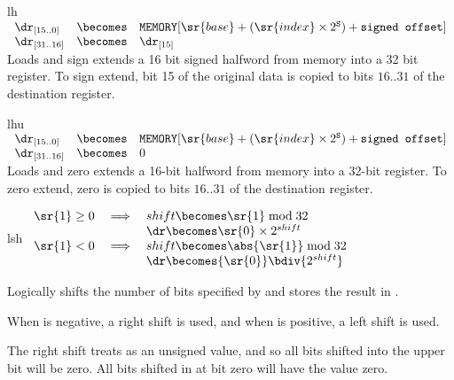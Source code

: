 \begin{instruction}{lh}
     {\lhopc}
     {
       \begin{math}
         \begin{array}{lcl}
           {\dr}_{[15..0]} & \becomes & \texttt{MEMORY}[\sr{base} +
            (\sr{index} \times 2^{\texttt{S}}) + \texttt{signed offset}] \\
           {\dr}_{[31..16]} & \becomes & {\dr}_{[15]} \\
         \end{array}
       \end{math}
     }
     {
       Loads and sign extends a 16 bit signed halfword from memory
       into a 32 bit register.  To sign extend, bit 15 of
       the original data is copied to bits ${16..31}$ of the
       destination register.
     }
\end{instruction}

\begin{instruction}{lhu}
     {\lhuopc}
     {
       \begin{math}
         \begin{array}{lcl}
           {\dr}_{[15..0]} & \becomes & \texttt{MEMORY}[\sr{base} +
            (\sr{index} \times 2^{\texttt{S}}) + \texttt{signed offset}] \\
           {\dr}_{[31..16]} & \becomes & 0 \\
         \end{array}
       \end{math}
     }
     {
       Loads and zero extends a 16-bit halfword from memory into a
       32-bit register.  To zero extend, zero is copied to bits
       ${16..31}$ of the destination register.
     }
\end{instruction}


\begin{instruction}{lsh}
   {\rlshopc}
   {
     \begin{math}
       \begin{array}{rcl}
         \sr{1} \geq 0 & \implies & shift \becomes \sr{1} \bmod 32  \\
                       &          & \dr \becomes \sr{0} \times 2^{shift}  \\
         \sr{1} <    0 & \implies & shift \becomes \abs{\sr{1}} \bmod 32        \\
                       &          & \dr \becomes {\sr{0}} \bdiv {2^{shift} }\\
       \end{array}
     \end{math}
   }
   {
     Logically shifts  the number of bits specified by 
     and stores the result in \dr.

     When  is negative, a right shift is used, and when 
     is positive, a left shift is used.

     The right shift treats  as an unsigned value, and so all
     bits shifted into the upper bit will be zero.  All bits shifted
     in at bit zero will have the value zero.
   }
\end{instruction}


